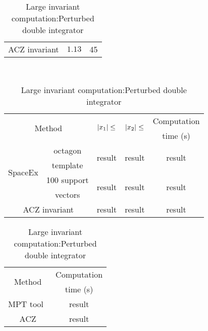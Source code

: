 \begin{table}
\begin{minipage}{0.48\textwidth}
\begin{tabular}{|l|c|c|c|}
\hline
\multicolumn{2}{|c|}{\multirow{2}{*}{ACZ invariant}} & \multirow{2}{*}{$1.13$} &
\multirow{2}{*}{45}\\
\multicolumn{2}{|c|}{} & &\\
\hline
\end{tabular}
\caption{Saturated robot model results}
~\label{tab:robot-saturated}
\end{minipage}
%
\begin{minipage}{0.45\textwidth}
\begin{tabular}{|l|c|c|c|c|}
\hline
\multicolumn{2}{|c|}{\multirow{2}{*}{Method}} &
\multirow{2}{*}{$\left|x_1\right|\leq$} & \multirow{2}{*}{$\left|x_2\right|\leq$} & Computation\\
\multicolumn{2}{|c|}{} & & & time (s) \\
\hline
\multirow{4}{*}{SpaceEx} & octagon & \multirow{2}{*}{result} &
\multirow{2}{*}{result} & \multirow{2}{*}{result}\\
& template & & &\\
\cline{2-5}
& 100 support & \multirow{2}{*}{result} & \multirow{2}{*}{result} & \multirow{2}{*}{result}\\
& vectors & & &\\
\hline
\multicolumn{2}{|c|}{\multirow{2}{*}{ACZ invariant}} &
\multirow{2}{*}{result} & \multirow{2}{*}{result} & 
\multirow{2}{*}{result}\\
\multicolumn{2}{|c|}{} & & &\\
\hline
\end{tabular}
\caption{Small invariant computation:\newline Perturbed double integrator}
\end{minipage}
\hspace{4em}
\begin{minipage}{0.45\textwidth}
\begin{tabular}{|c|c|}
\hline
\multirow{2}{*}{Method} & Computation\\
& time (s)\\
\hline
\multirow{2}{*}{MPT tool~\cite{TODO}} & \multirow{2}{*}{result}\\
& \\
\hline
\multirow{2}{*}{ACZ} & \multirow{2}{*}{result}\\
& \\
\hline
\end{tabular}
\caption{Large invariant computation:\newline Perturbed double integrator}
\end{minipage}
\end{table}

